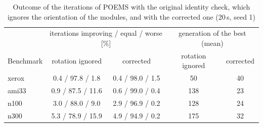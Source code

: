 \begin{table}
\centering
\small
\begin{tabular}{@{}lcccc@{}}
\toprule
 & \multicolumn{2}{c}{iterations improving / equal / worse [\%]} & \multicolumn{2}{c}{generation of the best (mean)} \\
Benchmark & rotation ignored & corrected & rotation ignored & corrected \\
\midrule
xerox & 0.4 / 97.8 / 1.8 & 0.4 / 98.0 / 1.5 & 50 & 40 \\
ami33 & 0.9 / 87.5 / 11.6 & 0.6 / 99.0 / 0.4 & 138 & 23 \\
n100 & 3.0 / 88.0 / 9.0 & 2.9 / 96.9 / 0.2 & 128 & 24 \\
n300 & 5.3 / 78.9 / 15.9 & 4.9 / 94.9 / 0.2 & 175 & 32 \\
\bottomrule
\end{tabular}
\caption{Outcome of the iterations of POEMS with the original identity check, which ignores the orientation of the modules, and with the corrected one (20\,s, seed 1)}
\label{tab:rotation}
\end{table}

